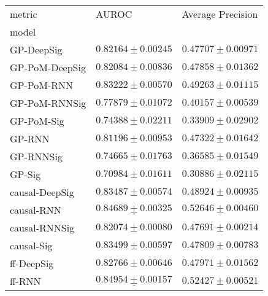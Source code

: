 \begin{tabular}{lll}
\toprule
metric &                                             AUROC &                                 Average Precision \\
model          &                                                   &                                                   \\
\midrule
GP-DeepSig     &                           $ 0.82164 \pm 0.00245 $ &                           $ 0.47707 \pm 0.00971 $ \\
GP-PoM-DeepSig &                           $ 0.82084 \pm 0.00836 $ &                           $ 0.47858 \pm 0.01362 $ \\
GP-PoM-RNN     &                           $ 0.83222 \pm 0.00570 $ &                           $ 0.49263 \pm 0.01115 $ \\
GP-PoM-RNNSig  &                           $ 0.77879 \pm 0.01072 $ &                           $ 0.40157 \pm 0.00539 $ \\
GP-PoM-Sig     &                           $ 0.74388 \pm 0.02211 $ &                           $ 0.33909 \pm 0.02902 $ \\
GP-RNN         &                           $ 0.81196 \pm 0.00953 $ &                           $ 0.47322 \pm 0.01642 $ \\
GP-RNNSig      &                           $ 0.74665 \pm 0.01763 $ &                           $ 0.36585 \pm 0.01549 $ \\
GP-Sig         &                           $ 0.70984 \pm 0.01611 $ &                           $ 0.30886 \pm 0.02115 $ \\
causal-DeepSig &                           $ 0.83487 \pm 0.00574 $ &                           $ 0.48924 \pm 0.00935 $ \\
causal-RNN     &            $  \underline{ 0.84689 \pm 0.00325 } $ &  $  \mathbf{ \underline{ 0.52646 \pm 0.00460 }} $ \\
causal-RNNSig  &                           $ 0.82074 \pm 0.00080 $ &                           $ 0.47691 \pm 0.00214 $ \\
causal-Sig     &                           $ 0.83499 \pm 0.00597 $ &                           $ 0.47809 \pm 0.00783 $ \\
ff-DeepSig     &                           $ 0.82766 \pm 0.00646 $ &                           $ 0.47971 \pm 0.01562 $ \\
ff-RNN         &  $  \mathbf{ \underline{ 0.84954 \pm 0.00157 }} $ &               $  \mathbf{ 0.52427 \pm 0.00521 } $ \\

\end{tabular}
